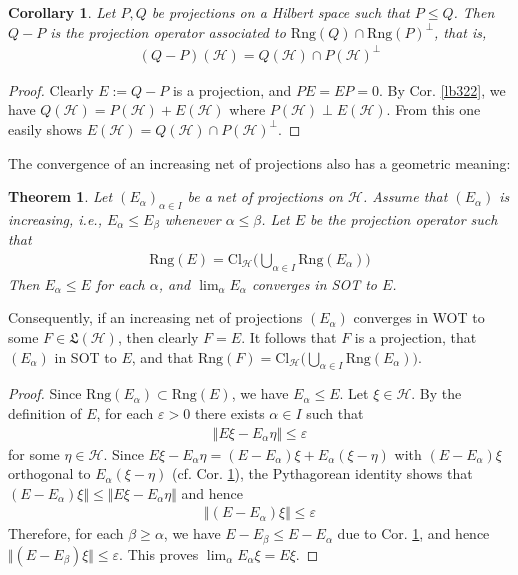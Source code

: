 \documentclass[12pt,b5paper,notitlepage]{article}
\theoremstyle{definition}
\theoremstyle{plain}
\newtheorem{thm}[df]{Theorem}
\newtheorem{co}[df]{Corollary}
\newcommand{\fk}{\mathfrak}
\newcommand{\Rng}{\mathrm{Rng}}
\newcommand{\Cl}{\mathrm{Cl}}
\newcommand{\eps}{\varepsilon}
\newcommand{\MH}{\mathcal H}
\numberwithin{equation}{section}
\begin{document}
\begin{co}\label{lb263}
Let $P,Q$ be projections on a Hilbert space such that $P\leq Q$. Then $Q-P$ is the projection operator associated to $\Rng(Q)\cap\Rng(P)^\perp$, that is,
\begin{align*}
(Q-P)(\MH)=Q(\MH)\cap P(\MH)^\perp
\end{align*}
\end{co}

\begin{proof}
Clearly $E:=Q-P$ is a projection, and $PE=EP=0$. By Cor. \ref{lb322}, we have $Q(\MH)=P(\MH)+E(\MH)$ where $P(\MH)\perp E(\MH)$. From this one easily shows $E(\MH)=Q(\MH)\cap P(\MH)^\perp$.
\end{proof}


The convergence of an increasing net of projections also has a geometric meaning:

\begin{thm}\label{lb264}
Let $(E_\alpha)_{\alpha\in I}$ be a net of projections on $\MH$. Assume that $(E_\alpha)$ is increasing, i.e., $E_\alpha\leq E_\beta$ whenever $\alpha\leq\beta$. Let $E$ be the projection operator such that
\begin{align}
\Rng(E)=\Cl_\MH\Big(\bigcup_{\alpha\in I}\Rng(E_\alpha)\Big)
\end{align}
Then $E_\alpha\leq E$ for each $\alpha$, and $\lim_\alpha E_\alpha$ converges in SOT to $E$.
\end{thm}

Consequently, if an increasing net of projections $(E_\alpha)$ converges in WOT to some $F\in\fk L(\MH)$, then clearly $F=E$. It follows that $F$ is a projection, that $(E_\alpha)$ in SOT to $E$, and that $\Rng(F)=\Cl_\MH\big(\bigcup_{\alpha\in I}\Rng(E_\alpha)\big)$.

\begin{proof}
Since $\Rng(E_\alpha)\subset\Rng(E)$, we have $E_\alpha\leq E$. Let $\xi\in\MH$. By the definition of $E$, for each $\eps>0$ there exists $\alpha\in I$ such that
\begin{align*}
\Vert E\xi-E_\alpha\eta\Vert\leq\eps
\end{align*}
for some $\eta\in\MH$. Since $E\xi-E_\alpha\eta=(E-E_\alpha)\xi+E_\alpha(\xi-\eta)$ with $(E-E_\alpha)\xi$ orthogonal to $E_\alpha(\xi-\eta)$ (cf. Cor. \ref{lb263}), the Pythagorean identity shows that $(E-E_\alpha)\xi\Vert\leq\Vert E\xi-E_\alpha\eta\Vert$ and hence
\begin{align*}
\Vert (E-E_\alpha)\xi\Vert\leq\eps
\end{align*}
Therefore, for each $\beta\geq\alpha$, we have $E-E_\beta\leq E-E_\alpha$ due to Cor. \ref{lb263}, and hence $\Vert (E-E_\beta)\xi\Vert\leq\eps$. This proves $\lim_\alpha E_\alpha\xi=E\xi$.
\end{proof}
\end{document}
